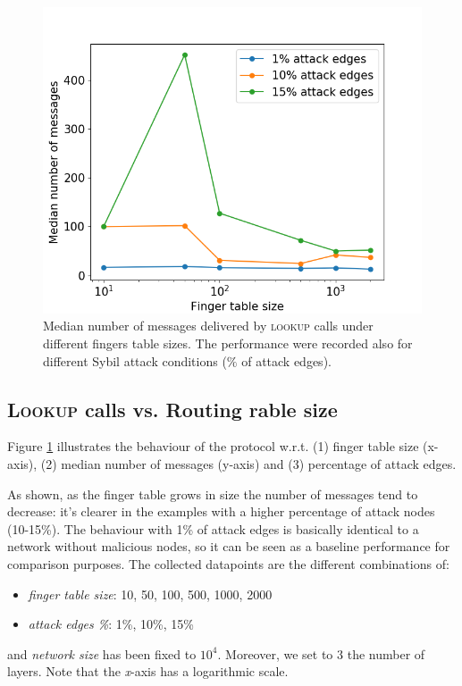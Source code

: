 \begin{figure}[t]
    \centering
    \includegraphics[scale=0.4]{exp1.png}
    \caption{Median number of messages delivered by \textsc{lookup} calls under different fingers table sizes. The performance were recorded also for different Sybil attack conditions ($\%$ of attack edges).}
    \label{fig:experiment_1}
\end{figure}

\subsection{\textsc{Lookup} calls vs. Routing rable size}

Figure \ref{fig:experiment_1} illustrates the behaviour of the protocol w.r.t. (1) finger table size (x-axis), (2) median number of messages (y-axis) and (3) percentage of attack edges.

As shown, as the finger table grows in size the number of messages tend to decrease: it's clearer in the examples with a higher percentage of attack nodes (10-15\%). The behaviour with 1\% of attack edges is basically identical to a network without malicious nodes, so it can be seen as a baseline performance for comparison purposes.
The collected datapoints are the different combinations of:
\begin{itemize}
    \item \textit{finger table size}: 10, 50, 100, 500, 1000, 2000
    \item \textit{attack edges \%}: 1\%, 10\%, 15\%
\end{itemize}
and \textit{network size} has been fixed to $10^4$. Moreover, we set to 3 the number of layers. Note that the \textit{x}-axis has a logarithmic scale.

